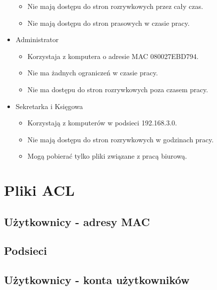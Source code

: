 \documentclass{article}
\begin{document}
\begin{itemize}
\begin{itemize}
        \item Nie mają dostępu do stron rozrywkowych przez cały czas.
        \item Nie mają dostępu do stron prasowych w czasie pracy.
    \end{itemize}
    \item Administrator
    \begin{itemize}
        \item Korzystaja z komputera o adresie MAC 080027EBD794.
        \item Nie ma żadnych ograniczeń w czasie pracy.
        \item Nie ma dostępu do stron rozrywkowych poza czasem pracy.
    \end{itemize}
    \item Sekretarka i Księgowa
    \begin{itemize}
        \item Korzystają z komputerów w podsieci 192.168.3.0.
        \item Nie mają dostępu do stron rozrywkowych w godzinach pracy.
        \item Mogą pobierać tylko pliki związane z pracą biurową.
    \end{itemize}
\end{itemize}

\section{Pliki ACL}
\subsection{Użytkownicy - adresy MAC}




\subsection{Podsieci}



\subsection{Użytkownicy - konta użytkowników}


\end{document}
